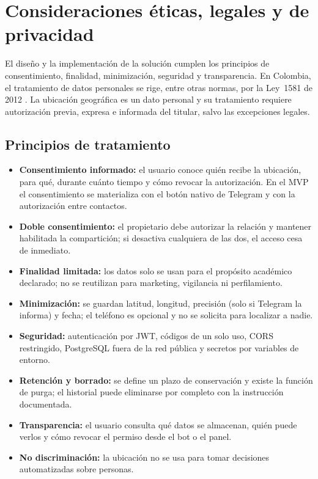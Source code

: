 \section{Consideraciones éticas, legales y de privacidad}\label{sec:etica-parte2}

El diseño y la implementación de la solución cumplen los principios de consentimiento, finalidad, minimización, seguridad y transparencia. En Colombia, el tratamiento de datos personales se rige, entre otras normas, por la Ley~1581 de 2012 \parencite{ley1581}. La ubicación geográfica es un dato personal y su tratamiento requiere autorización previa, expresa e informada del titular, salvo las excepciones legales.

\subsection{Principios de tratamiento}

\begin{itemize}[leftmargin=*, topsep=2pt, itemsep=2pt]
	\item \textbf{Consentimiento informado:} el usuario conoce quién recibe la ubicación, para qué, durante cuánto tiempo y cómo revocar la autorización. En el MVP el consentimiento se materializa con el botón nativo de Telegram y con la autorización entre contactos.
	\item \textbf{Doble consentimiento:} el propietario debe autorizar la relación y mantener habilitada la compartición; si desactiva cualquiera de las dos, el acceso cesa de inmediato.
	\item \textbf{Finalidad limitada:} los datos solo se usan para el propósito académico declarado; no se reutilizan para marketing, vigilancia ni perfilamiento.
	\item \textbf{Minimización:} se guardan latitud, longitud, precisión (solo si Telegram la informa) y fecha; el teléfono es opcional y no se solicita para localizar a nadie.
	\item \textbf{Seguridad:} autenticación por JWT, códigos de un solo uso, CORS restringido, PostgreSQL fuera de la red pública y secretos por variables de entorno.
	\item \textbf{Retención y borrado:} se define un plazo de conservación y existe la función de purga; el historial puede eliminarse por completo con la instrucción documentada.
	\item \textbf{Transparencia:} el usuario consulta qué datos se almacenan, quién puede verlos y cómo revocar el permiso desde el bot o el panel.
	\item \textbf{No discriminación:} la ubicación no se usa para tomar decisiones automatizadas sobre personas.
\end{itemize}

